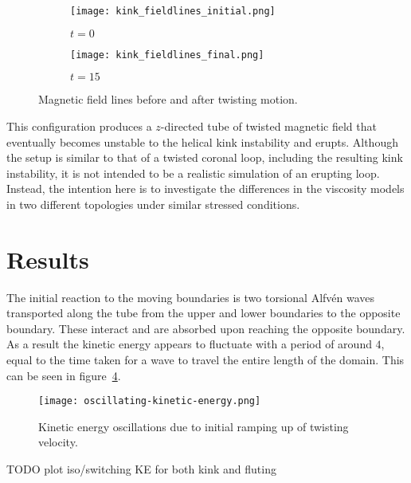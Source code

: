 \begin{figure}[t]
  \centering
  \begin{subfigure}{.45\textwidth}
  \centering
  \texttt{[image: kink\_fieldlines\_initial.png]}
  \caption{$t=0$}
  \label{fig:initial_kink_field}
  \end{subfigure}
  \begin{subfigure}{.45\textwidth}
  \centering
  \texttt{[image: kink\_fieldlines\_final.png]}
  \caption{$t=15$}
  \label{fig:twisted_kink_field}
  \end{subfigure}
  \caption{Magnetic field lines before and after twisting motion.}
  \label{fig:kink_field_lines}
\end{figure}

This configuration produces a $z$-directed tube of twisted magnetic field that eventually becomes unstable to the helical kink instability and erupts. Although the setup is similar to that of a twisted coronal loop, including the resulting kink instability, it is not intended to be a realistic simulation of an erupting loop. Instead, the intention here is to investigate the differences in the viscosity models in two different topologies under similar stressed conditions.

\section{Results}

The initial reaction to the moving boundaries is two torsional Alfv\'en waves transported along the tube from the upper and lower boundaries to the opposite boundary. These interact and are absorbed upon reaching the opposite boundary. As a result the kinetic energy appears to fluctuate with a period of around $4$, equal to the time taken for a wave to travel the entire length of the domain. This can be seen in figure~\ref{fig:oscillating-kinetic-energy}.

\begin{figure}[t]
  \centering
  \texttt{[image: oscillating-kinetic-energy.png]}
  \caption{Kinetic energy oscillations due to initial ramping up of twisting velocity.}
  \label{fig:oscillating-kinetic-energy}
\end{figure}

TODO plot iso/switching KE for both kink and fluting

